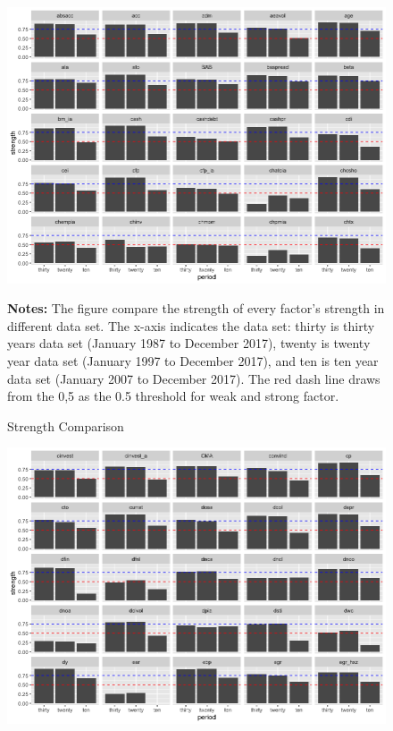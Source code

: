\documentclass[12pt]{article}
\begin{document}
\begin{landscape}
\begin{figure}[ht]\caption{Strength Comparison}
			\centering
				\includegraphics[scale = 0.7]{strength_comparison_I}
			\begin{minipage}{\textwidth}
	{\footnotesize {\bf Notes:} The figure compare the strength of every factor's strength in different data set. The x-axis indicates the data set: thirty is thirty years data set (January 1987 to December 2017), twenty is twenty year data set (January 1997 to December 2017), and ten is ten year data set (January 2007 to December 2017). The red dash line draws from the 0,5 as the 0.5 threshold for weak and strong factor.}
			\end{minipage}
\end{figure}
\end{landscape}


\begin{landscape}
	\begin{figure}[ht]
		\includegraphics[scale = 0.7]{strength_comparison_II}
		\centering
	\end{figure}
\end{landscape}
\end{document}
